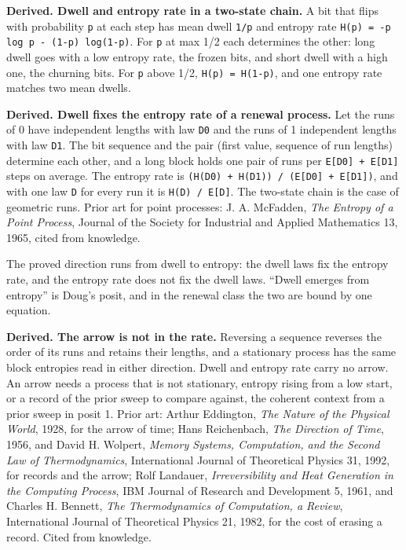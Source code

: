 \textbf{Derived. Dwell and entropy rate in a two-state chain.} A bit that flips with probability \texttt{p} at each step has mean dwell \texttt{1/\allowbreak{}p} and entropy rate \texttt{H(p) = -\allowbreak{}p log p -\allowbreak{} (1-\allowbreak{}p) log(1-\allowbreak{}p)}. For \texttt{p} at max 1/2 each determines the other: long dwell goes with a low entropy rate, the frozen bits, and short dwell with a high one, the churning bits. For \texttt{p} above 1/2, \texttt{H(p) = H(1-\allowbreak{}p)}, and one entropy rate matches two mean dwells.

\textbf{Derived. Dwell fixes the entropy rate of a renewal process.} Let the runs of 0 have independent lengths with law \texttt{D0} and the runs of 1 independent lengths with law \texttt{D1}. The bit sequence and the pair (first value, sequence of run lengths) determine each other, and a long block holds one pair of runs per \texttt{E[D0] + E[D1]} steps on average. The entropy rate is \texttt{(H(D0) + H(D1)) /\allowbreak{} (E[D0] + E[D1])}, and with one law \texttt{D} for every run it is \texttt{H(D) /\allowbreak{} E[D]}. The two-state chain is the case of geometric runs. Prior art for point processes: J. A. McFadden, \emph{The Entropy of a Point Process}, Journal of the Society for Industrial and Applied Mathematics 13, 1965, cited from knowledge.

The proved direction runs from dwell to entropy: the dwell laws fix the entropy rate, and the entropy rate does not fix the dwell laws. “Dwell emerges from entropy” is Doug's posit, and in the renewal class the two are bound by one equation.

\textbf{Derived. The arrow is not in the rate.} Reversing a sequence reverses the order of its runs and retains their lengths, and a stationary process has the same block entropies read in either direction. Dwell and entropy rate carry no arrow. An arrow needs a process that is not stationary, entropy rising from a low start, or a record of the prior sweep to compare against, the coherent context from a prior sweep in posit 1. Prior art: Arthur Eddington, \emph{The Nature of the Physical World}, 1928, for the arrow of time; Hans Reichenbach, \emph{The Direction of Time}, 1956, and David H. Wolpert, \emph{Memory Systems, Computation, and the Second Law of Thermodynamics}, International Journal of Theoretical Physics 31, 1992, for records and the arrow; Rolf Landauer, \emph{Irreversibility and Heat Generation in the Computing Process}, IBM Journal of Research and Development 5, 1961, and Charles H. Bennett, \emph{The Thermodynamics of Computation, a Review}, International Journal of Theoretical Physics 21, 1982, for the cost of erasing a record. Cited from knowledge.


